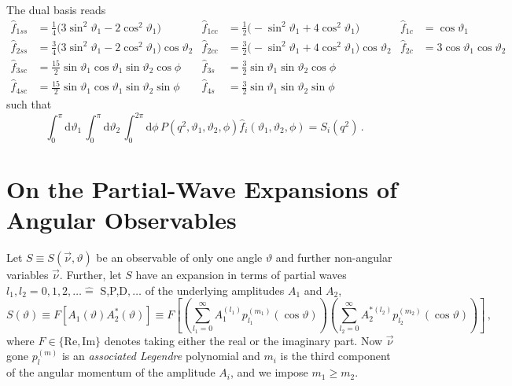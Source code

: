 \documentclass[aps,prd,reprint,nofootinbib,preprintnumbers]{revtex4}
\newcommand{\rmdx}[1]{\mbox{d} #1 \,} %
\newcommand{\nuvec}{\vec{\nu}}
\renewcommand{\theta}{\vartheta}
\newcommand{\fred}[1]{{\color{brown!85!black}#1}}
\begin{document}
The dual basis reads
\begin{equation}
    \begin{aligned}
        \hat f_{1ss} & = \frac{1}{4}\big(3 \sin^2\theta_1 - 2 \cos^2\theta_1\big) &
        \hat f_{1cc} & = \frac{1}{2}\big(- \sin^2\theta_1 + 4 \cos^2\theta_1\big) &
        \hat f_{1c}  & = \cos\theta_1\\
        \hat f_{2ss} & = \frac{3}{4}\big(3 \sin^2\theta_1 - 2 \cos^2\theta_1\big) \cos\theta_2 &
        \hat f_{2cc} & = \frac{3}{2}\big(- \sin^2\theta_1 + 4 \cos^2\theta_1\big) \cos\theta_2 &
        \hat f_{2c}  & = 3 \cos\theta_1   \cos\theta_2 \\
        \hat f_{3sc} & = \frac{15}{2}\sin\theta_1 \cos\theta_1 \sin\theta_2 \cos\phi &
        \hat f_{3s}  & = \frac{3}{2} \sin\theta_1              \sin\theta_2 \cos\phi \\
        \hat f_{4sc} & = \frac{15}{2}\sin\theta_1 \cos\theta_1 \sin\theta_2 \sin\phi &
        \hat f_{4s}  & = \frac{3}{2} \sin\theta_1              \sin\theta_2 \sin\phi
    \end{aligned}
\end{equation}
such that
\begin{equation}
    \int_0^\pi \rmdx{\theta_1} \int_0^\pi \rmdx{\theta_2} \int_0^{2\pi} \rmdx{\phi} P(q^2, \theta_1, \theta_2, \phi) \hat{f}_i(\theta_1, \theta_2, \phi) = S_i(q^2)\,.
\end{equation}


\section{On the Partial-Wave Expansions of Angular Observables}
\label{app:partial-waves}

Let $S \equiv S(\vec{\nu},\theta)$ be an observable of only one angle $\theta$ and further non-angular variables $\vec{\nu}$. Further, let
$S$ have an expansion in terms of partial waves $l_1, l_2 = 0,1,2,\dots \hat{=}$ S,P,D$,\dots$ of the underlying amplitudes $A_1$ and $A_2$,
\begin{equation}
    \label{eq:def-partial-wave-observable}
    S(\theta) \equiv F\left[A_1(\theta) A_2^*(\theta)\right] \equiv F\left[\left(\sum_{l_1=0}^\infty A_1^{(l_1)} p_{l_1}^{(m_1)}(\cos\theta)\right) \left(\sum_{l_2=0}^\infty A_2^{*(l_2)} p_{l_2}^{(m_2)}(\cos\theta)\right)\right]\,,
\end{equation}
where $F \in \{\text{Re},\text{Im}\}$ denotes taking either the real
or the imaginary part. \fred{Now $\nuvec$ gone}
$p_{l}^{(m)}$ is an \emph{associated Legendre} polynomial and $m_i$ is the third component of the angular momentum of the amplitude $A_i$, and we impose $m_1 \geq m_2$.\\
\end{document}
